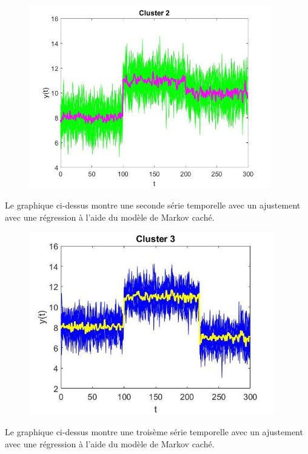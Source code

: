 \documentclass[11pt]{article}
\begin{document}
\begin{figure}[h]
\begin{center}
\includegraphics[height=8cm]{cl2.jpg}
\end{center}
\end{figure}

Le graphique ci-dessus montre une seconde série temporelle avec un ajustement avec une régression à l'aide du modèle de Markov caché.\\

\newpage
\begin{figure}[h]
\begin{center}
\includegraphics[height=8cm]{cl3.jpg}
\end{center}
\end{figure}

Le graphique ci-dessus montre une troisème série temporelle avec un ajustement avec une régression à l'aide du modèle de Markov caché.\\
\end{document}
